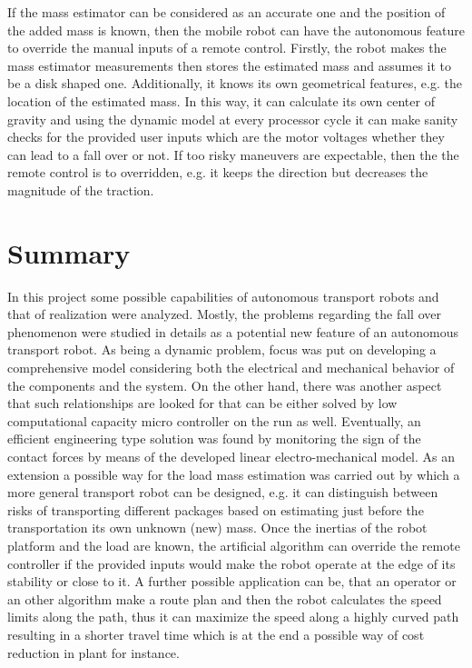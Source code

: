 \documentclass[12pt,english,twoside]{article}
\begin{document}
If the mass estimator can be considered as an accurate one and the position of the added mass is known, then the mobile robot can have the autonomous feature to override the manual inputs of a remote control. Firstly, the robot makes the mass estimator measurements then stores the estimated mass and assumes it to be a disk shaped one. Additionally, it knows its own geometrical features, e.g. the location of the estimated mass. In this way, it can calculate its own center of gravity and using the dynamic model at every processor cycle it can make sanity checks for the provided user inputs which are the motor voltages whether they can lead to a fall over or not. If too risky maneuvers are expectable, then the the remote control is to overridden, e.g. it keeps the direction but decreases the magnitude of the traction.



\newpage
\newpage
\section*{Summary}
In this project some possible capabilities of autonomous transport robots and that of realization were analyzed. Mostly, the problems regarding the fall over phenomenon were studied in details as a potential new feature of an autonomous transport robot. As being a dynamic problem, focus was put on developing a comprehensive model considering both the electrical and mechanical behavior of the components and the system. On the other hand, there was another aspect that such relationships are looked for that can be either solved by low computational capacity micro controller on the run as well. Eventually, an efficient engineering type solution was found by monitoring the sign of the contact forces by means of the developed linear electro-mechanical model. As an extension a possible way for the load mass estimation was carried out by which a more general transport robot can be designed, e.g. it can distinguish between risks of transporting different packages based on estimating just before the transportation its own unknown (new) mass. Once the inertias of the robot platform and the load are known, the artificial algorithm can override the remote controller if the provided inputs would make the robot operate at the edge of its stability or close to it. A further possible application can be, that an operator or an other algorithm make a route plan and then the robot calculates the speed limits along the path, thus it can maximize the speed along a highly curved path resulting in a shorter travel time which is at the end a possible way of cost reduction in plant for instance.
\end{document}
